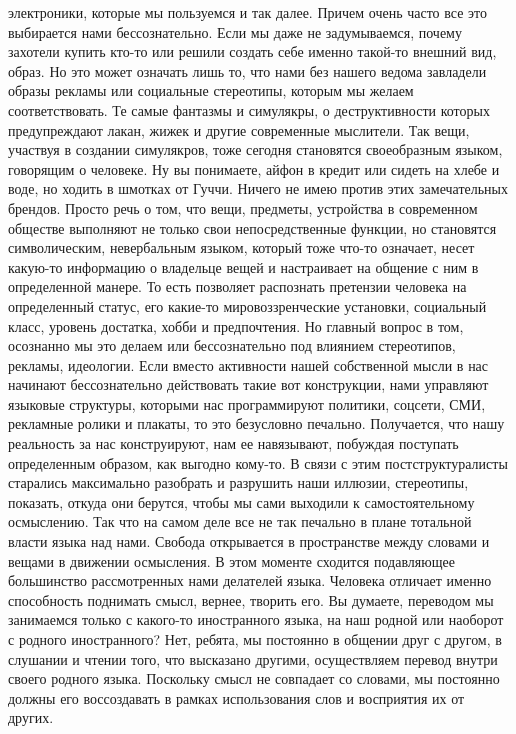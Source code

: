 электроники, которые мы пользуемся и так далее. Причем очень часто все это
выбирается нами бессознательно. Если мы даже не задумываемся, почему захотели
купить кто-то или решили создать себе именно такой-то внешний вид, образ. Но это
может означать лишь то, что нами без нашего ведома завладели образы рекламы или
социальные стереотипы, которым мы желаем соответствовать. Те самые фантазмы и
симулякры, о деструктивности которых предупреждают лакан, жижек и другие
современные мыслители. Так вещи, участвуя в создании симулякров, тоже сегодня
становятся своеобразным языком, говорящим о человеке. Ну вы понимаете, айфон в
кредит или сидеть на хлебе и воде, но ходить в шмотках от Гуччи. Ничего не имею
против этих замечательных брендов. Просто речь о том, что вещи, предметы,
устройства в современном обществе выполняют не только свои непосредственные
функции, но становятся символическим, невербальным языком, который тоже что-то
означает, несет какую-то информацию о владельце вещей и настраивает на общение с
ним в определенной манере. То есть позволяет распознать претензии человека на
определенный статус, его какие-то мировоззренческие установки, социальный класс,
уровень достатка, хобби и предпочтения. Но главный вопрос в том, осознанно мы
это делаем или бессознательно под влиянием стереотипов, рекламы, идеологии. Если
вместо активности нашей собственной мысли в нас начинают бессознательно
действовать такие вот конструкции, нами управляют языковые структуры, которыми
нас программируют политики, соцсети, СМИ, рекламные ролики и плакаты, то это
безусловно печально. Получается, что нашу реальность за нас конструируют, нам ее
навязывают, побуждая поступать определенным образом, как выгодно кому-то. В
связи с этим постструктуралисты старались максимально разобрать и разрушить наши
иллюзии, стереотипы, показать, откуда они берутся, чтобы мы сами выходили к
самостоятельному осмыслению. Так что на самом деле все не так печально в плане
тотальной власти языка над нами. Свобода открывается в пространстве между
словами и вещами в движении осмысления. В этом моменте сходится подавляющее
большинство рассмотренных нами делателей языка. Человека отличает именно
способность поднимать смысл, вернее, творить его. Вы думаете, переводом мы
занимаемся только с какого-то иностранного языка, на наш родной или наоборот с
родного иностранного? Нет, ребята, мы постоянно в общении друг с другом, в
слушании и чтении того, что высказано другими, осуществляем перевод внутри
своего родного языка. Поскольку смысл не совпадает со словами, мы постоянно
должны его воссоздавать в рамках использования слов и восприятия их от других.
